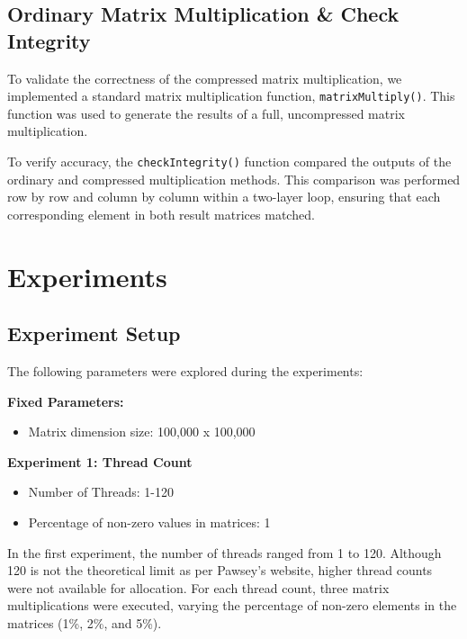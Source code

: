 \documentclass[
]{article}
\begin{document}
\subsection{Ordinary Matrix Multiplication \& Check
Integrity}\label{ordinary-matrix-multiplication-check-integrity}

To validate the correctness of the compressed matrix multiplication, we
implemented a standard matrix multiplication function,
\texttt{matrixMultiply()}. This function was used to generate the
results of a full, uncompressed matrix multiplication.

To verify accuracy, the \texttt{checkIntegrity()} function compared the
outputs of the ordinary and compressed multiplication methods. This
comparison was performed row by row and column by column within a
two-layer loop, ensuring that each corresponding element in both result
matrices matched.

\vspace{0.5cm}

\section{Experiments}\label{experiments}

\subsection{Experiment Setup}\label{experiment-setup}

The following parameters were explored during the experiments:

\textbf{Fixed Parameters:}

\begin{itemize}
  \item Matrix dimension size: 100,000 x 100,000
\end{itemize}

\textbf{Experiment 1: Thread Count}

\begin{itemize}
  \item Number of Threads: 1-120
  \item Percentage of non-zero values in matrices: 1%
\end{itemize}

In the first experiment, the number of threads ranged from 1 to 120.
Although 120 is not the theoretical limit as per Pawsey's website,
higher thread counts were not available for allocation. For each thread
count, three matrix multiplications were executed, varying the
percentage of non-zero elements in the matrices (1\%, 2\%, and 5\%).
\end{document}
